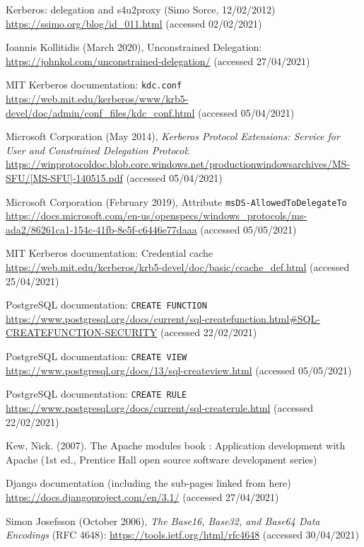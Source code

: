 \documentclass[12pt]{report}
\begin{document}
\begin{thebibliography}{99}
 Kerberos: delegation and s4u2proxy (Simo Sorce, 12/02/2012) \url{https://ssimo.org/blog/id_011.html} (accessed 02/02/2021)

 Ioannis Kollitidis (March 2020), Unconstrained Delegation: \url{https://johnkol.com/unconstrained-delegation/} (accessed 27/04/2021)

 MIT Kerberos documentation: \texttt{kdc.conf} \url{https://web.mit.edu/kerberos/www/krb5-devel/doc/admin/conf_files/kdc_conf.html} (accessed 05/04/2021)

 Microsoft Corporation (May 2014), \textit{Kerberos Protocol Extensions: Service for User and Constrained Delegation Protocol}: \url{https://winprotocoldoc.blob.core.windows.net/productionwindowsarchives/MS-SFU/[MS-SFU]-140515.pdf} (accessed 05/04/2021)

 Microsoft Corporation (February 2019), Attribute \texttt{msDS-AllowedToDelegateTo} \url{https://docs.microsoft.com/en-us/openspecs/windows_protocols/ms-ada2/86261ca1-154c-41fb-8e5f-c6446e77daaa} (accessed 05/05/2021)

 MIT Kerberos documentation: Credential cache \url{https://web.mit.edu/kerberos/krb5-devel/doc/basic/ccache_def.html} (accessed 25/04/2021)

 PostgreSQL documentation: \texttt{CREATE FUNCTION} \url{https://www.postgresql.org/docs/current/sql-createfunction.html#SQL-CREATEFUNCTION-SECURITY} (accessed 22/02/2021)

 PostgreSQL documentation: \texttt{CREATE VIEW} \url{https://www.postgresql.org/docs/13/sql-createview.html} (accessed 05/05/2021)

 PostgreSQL documentation: \texttt{CREATE RULE} \url{https://www.postgresql.org/docs/current/sql-createrule.html} (accessed 22/02/2021)

 Kew, Nick. (2007). The Apache modules book : Application development with Apache (1st ed., Prentice Hall open source software development series)

 Django documentation (including the sub-pages linked from here) \url{https://docs.djangoproject.com/en/3.1/} (accessed 27/04/2021)

 Simon Josefsson (October 2006), \textit{The Base16, Base32, and Base64 Data Encodings} (RFC 4648): \url{https://tools.ietf.org/html/rfc4648} (accessed 30/04/2021)


\end{thebibliography}
\end{document}
